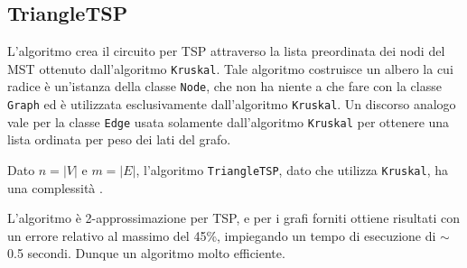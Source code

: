 \subsection{TriangleTSP}

L'algoritmo crea il circuito per TSP attraverso la lista preordinata dei nodi del MST ottenuto dall'algoritmo \texttt{Kruskal}. Tale algoritmo costruisce un albero la cui radice è un'istanza della classe \texttt{Node}, che non ha niente a che fare con la classe \texttt{Graph} ed è utilizzata esclusivamente dall'algoritmo \texttt{Kruskal}. Un discorso analogo vale per la classe \texttt{Edge} usata solamente dall'algoritmo \texttt{Kruskal} per ottenere una lista ordinata per peso dei lati del grafo.\acapo

Dato $n=|V|$ e $m=|E|$, l'algoritmo \texttt{TriangleTSP}, dato che utilizza \texttt{Kruskal}, ha una complessità .\acapo

L'algoritmo è 2-approssimazione per TSP, e per i grafi forniti ottiene risultati con un errore relativo al massimo del 45\%, impiegando un tempo di esecuzione di $\sim$0.5 secondi. Dunque un algoritmo molto efficiente.

